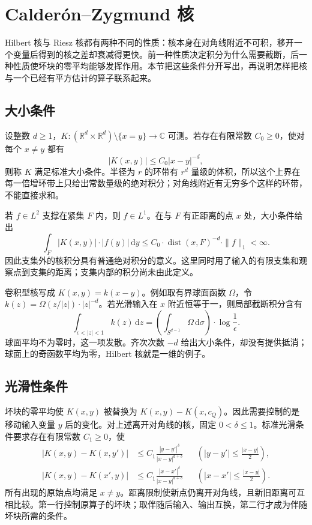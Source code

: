 \section{Calderón–Zygmund 核}
\label{b2:sec:1803}

Hilbert 核与 Riesz 核都有两种不同的性质：核本身在对角线附近不可积，移开一个变量后得到的核之差却衰减得更快。前一种性质决定积分为什么需要截断，后一种性质使坏块的零平均能够发挥作用。本节把这些条件分开写出，再说明怎样把核与一个已经有平方估计的算子联系起来。

\subsection{大小条件}
\label{b2:subsec:180301}

设整数 \(d\geq1\)，\(K:(\mathbb R^d\times\mathbb R^d)\setminus\{x=y\}\to\mathbb C\) 可测。若存在有限常数 \(C_0\geq0\)，使对每个 \(x\ne y\) 都有
\[
 |K(x,y)|\leq C_0|x-y|^{-d},
\]
则称 \(K\) 满足标准大小条件。半径为 \(r\) 的环带有 \(r^d\) 量级的体积，所以这个上界在每一倍增环带上只给出常数量级的绝对积分；对角线附近有无穷多个这样的环带，不能直接求和。

\ProseParagraphBreak

若 \(f\in L^2\) 支撑在紧集 \(F\) 内，则 \(f\in L^1\)。在与 \(F\) 有正距离的点 \(x\) 处，大小条件给出
\[
 \int_F|K(x,y)|\cdot|f(y)|\,\mathrm dy
 \leq C_0\cdot\operatorname{dist}(x,F)^{-d}\cdot\|f\|_1<\infty.
\]
因此支集外的核积分具有普通绝对积分的意义。这里同时用了输入的有限支集和观察点到支集的距离；支集内部的积分尚未由此定义。

\ProseParagraphBreak

卷积型核写成 \(K(x,y)=k(x-y)\)。例如取有界球面函数 \(\Omega\)，令 \(k(z)=\Omega(z/|z|)\cdot|z|^{-d}\)。若光滑输入在 \(x\) 附近恒等于一，则局部截断积分含有
\[
 \int_{\epsilon<|z|<1}k(z)\,\mathrm dz
 =\left(\int_{S^{d-1}}\Omega\,\mathrm d\sigma\right)\cdot
    \log\frac1\epsilon.
\]
球面平均不为零时，这一项发散。齐次次数 \(-d\) 给出大小条件，却没有提供抵消；球面上的奇函数平均为零，Hilbert 核就是一维的例子。

\subsection{光滑性条件}
\label{b2:subsec:180302}

坏块的零平均使 \(K(x,y)\) 被替换为 \(K(x,y)-K(x,c_Q)\)。因此需要控制的是移动输入变量 \(y\) 后的变化。对上述离开对角线的核，固定 \(0<\delta\leq1\)。标准光滑条件要求存在有限常数 \(C_1\geq0\)，使
\[
 \begin{aligned}
 |K(x,y)-K(x,y')|&\leq C_1\frac{|y-y'|^\delta}{|x-y|^{d+\delta}}
 &&\left(|y-y'|\leq\frac{|x-y|}2\right),\\
 |K(x,y)-K(x',y)|&\leq C_1\frac{|x-x'|^\delta}{|x-y|^{d+\delta}}
 &&\left(|x-x'|\leq\frac{|x-y|}2\right).
 \end{aligned}
\]
所有出现的原始点均满足 \(x\ne y\)。距离限制使新点仍离开对角线，且新旧距离可互相比较。第一行控制原算子的坏块；取伴随后输入、输出互换，第二行才成为伴随坏块所需的条件。

